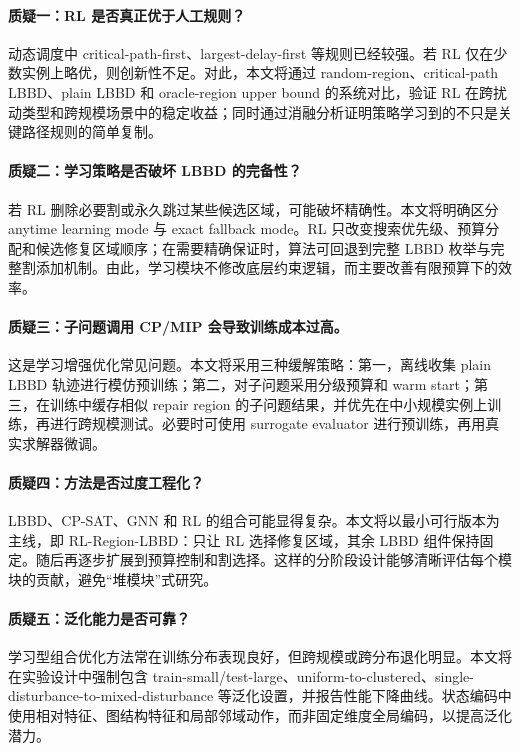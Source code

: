 \documentclass[UTF8,12pt,a4paper]{ctexart}
\begin{document}
\paragraph{质疑一：RL 是否真正优于人工规则？} 动态调度中 critical-path-first、largest-delay-first 等规则已经较强。若 RL 仅在少数实例上略优，则创新性不足。对此，本文将通过 random-region、critical-path LBBD、plain LBBD 和 oracle-region upper bound 的系统对比，验证 RL 在跨扰动类型和跨规模场景中的稳定收益；同时通过消融分析证明策略学习到的不只是关键路径规则的简单复制。

\paragraph{质疑二：学习策略是否破坏 LBBD 的完备性？} 若 RL 删除必要割或永久跳过某些候选区域，可能破坏精确性。本文将明确区分 anytime learning mode 与 exact fallback mode。RL 只改变搜索优先级、预算分配和候选修复区域顺序；在需要精确保证时，算法可回退到完整 LBBD 枚举与完整割添加机制。由此，学习模块不修改底层约束逻辑，而主要改善有限预算下的效率。

\paragraph{质疑三：子问题调用 CP/MIP 会导致训练成本过高。} 这是学习增强优化常见问题。本文将采用三种缓解策略：第一，离线收集 plain LBBD 轨迹进行模仿预训练；第二，对子问题采用分级预算和 warm start；第三，在训练中缓存相似 repair region 的子问题结果，并优先在中小规模实例上训练，再进行跨规模测试。必要时可使用 surrogate evaluator 进行预训练，再用真实求解器微调。

\paragraph{质疑四：方法是否过度工程化？} LBBD、CP-SAT、GNN 和 RL 的组合可能显得复杂。本文将以最小可行版本为主线，即 RL-Region-LBBD：只让 RL 选择修复区域，其余 LBBD 组件保持固定。随后再逐步扩展到预算控制和割选择。这样的分阶段设计能够清晰评估每个模块的贡献，避免“堆模块”式研究。

\paragraph{质疑五：泛化能力是否可靠？} 学习型组合优化方法常在训练分布表现良好，但跨规模或跨分布退化明显。本文将在实验设计中强制包含 train-small/test-large、uniform-to-clustered、single-disturbance-to-mixed-disturbance 等泛化设置，并报告性能下降曲线。状态编码中使用相对特征、图结构特征和局部邻域动作，而非固定维度全局编码，以提高泛化潜力。
\end{document}

